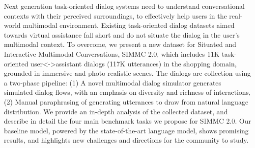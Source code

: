 Next generation task-oriented dialog systems need to understand conversational contexts with their perceived surroundings, to effectively help users in the real-world multimodal environment. Existing task-oriented dialog datasets aimed towards virtual assistance fall short and do not  situate the dialog in the user's multimodal context. To overcome, we present a new dataset for Situated and Interactive Multimodal Conversations, SIMMC 2.0, which includes 11K task-oriented user<->assistant dialogs (117K utterances) in the shopping domain, grounded in immersive and photo-realistic scenes. The dialogs are collection using a two-phase pipeline: (1) A novel multimodal dialog simulator generates simulated dialog flows, with an emphasis on diversity and richness of interactions, (2) Manual paraphrasing of generating utterances to draw from natural language distribution. We provide an in-depth analysis of the collected dataset, and describe in detail the four main benchmark tasks we propose for SIMMC 2.0. Our baseline model, powered by the state-of-the-art language model, shows promising  results, and highlights new challenges and directions for the community to study.
